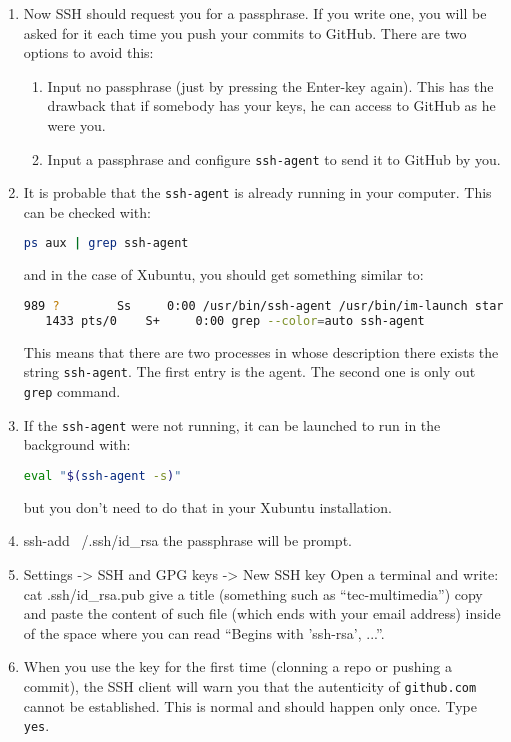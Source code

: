 \begin{enumerate}
\item Now SSH should request you for a passphrase. If you write one,
  you will be asked for it each time you push your commits to
  GitHub. There are two options to avoid this:

  \begin{enumerate}
  \item Input no passphrase (just by pressing the Enter-key
    again). This has the drawback that if somebody has your keys, he
    can access to GitHub as he were you.
  \item Input a passphrase and configure \texttt{ssh-agent} to send it
    to GitHub by you.
  \end{enumerate}

\item It is probable that the \texttt{ssh-agent} is already
  running in your computer. This can be checked with:

  \begin{lstlisting}[language=bash]
    ps aux | grep ssh-agent
  \end{lstlisting}

  and in the case of Xubuntu, you should get something similar to:

  \begin{lstlisting}[language=bash]
    989 ?        Ss     0:00 /usr/bin/ssh-agent /usr/bin/im-launch startxfce4
   1433 pts/0    S+     0:00 grep --color=auto ssh-agent
  \end{lstlisting}

  This means that there are two processes in whose description there
  exists the string \texttt{ssh-agent}. The first entry is the
  agent. The second one is only out \texttt{grep} command.

\item If the \texttt{ssh-agent} were not running, it can be launched to
  run in the background with:

  \begin{lstlisting}[language=bash]
    eval "$(ssh-agent -s)"
  \end{lstlisting}

  but you don't need to do that in your Xubuntu installation.

\item ssh-add ~/.ssh/id_rsa the passphrase will be prompt.
  
\item Settings -> SSH and GPG keys -> New SSH key
  Open a terminal and write:
  cat .ssh/id_rsa.pub
  give a title (something such as ``tec-multimedia'')
  copy and paste the content of such file (which ends with your email address) inside of the space where you can read ``Begins with 'ssh-rsa', ...''.

  \item When you use the key for the first time (clonning a repo or
    pushing a commit), the SSH client will warn you that the
    autenticity of \texttt{github.com} cannot be established. This is
    normal and should happen only once. Type \texttt{yes}.
  
\end{enumerate}


